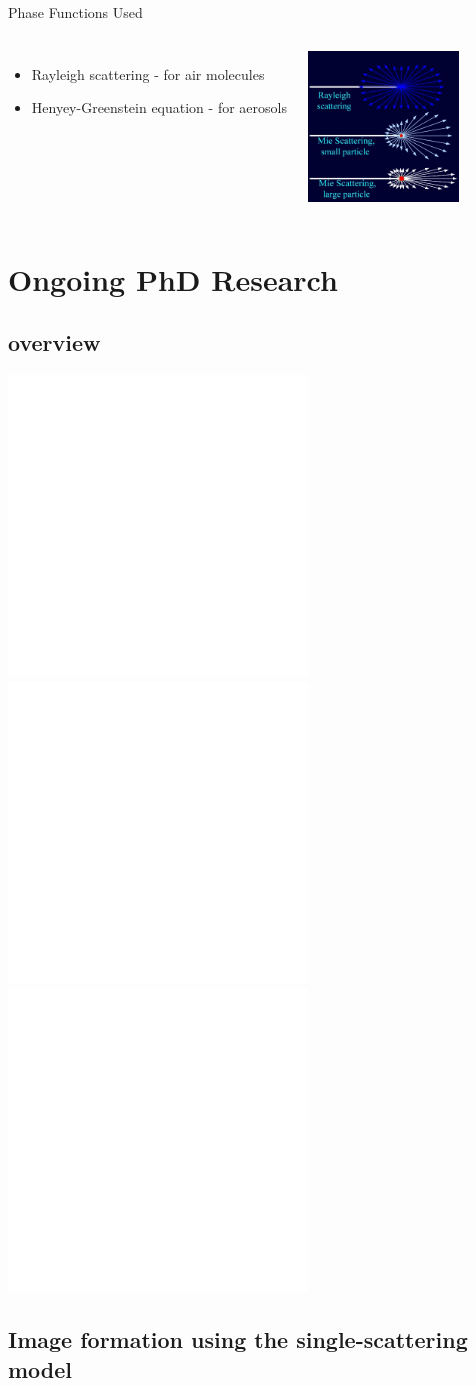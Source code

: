 \documentclass[compress,red,12pt]{beamer}
\begin{document}

\begin{frame}[T]{Phase Functions Used}
  \begin{columns}[T]
    \begin{itemize}
    \item Rayleigh scattering - for air molecules
    \item Henyey-Greenstein equation - for aerosols
    \end{itemize}
    \centering
    \includegraphics[height=4cm]{images/Mie_Rayleigh.jpg}
  \end{columns}
\end{frame}


\section{Ongoing PhD Research}


\subsection{overview}

\begin{frame}{}
  \begin{center}
    \includegraphics<1>[height=8cm]{images/diagram.pdf}    
    \includegraphics<2>[height=8cm]{images/diagram_reference_images.pdf}    
    \includegraphics<3>[height=8cm]{images/diagram_models.pdf}    
  \end{center}
\end{frame}


\subsection{Image formation using the single-scattering model}
\end{document}
